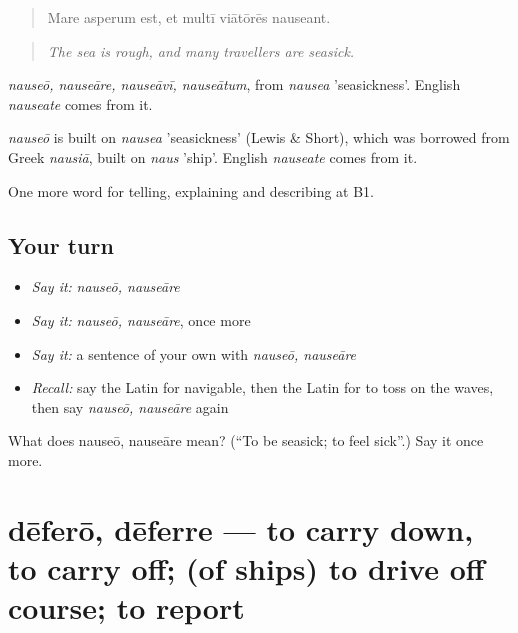 \begin{quote}
Mare asperum est, et multī viātōrēs nauseant.
\end{quote}

\begin{quote}
\emph{The sea is rough, and many travellers are seasick.}
\end{quote}

\emph{nauseō, nauseāre, nauseāvī, nauseātum}, from \emph{nausea} 'seasickness'. English \emph{nauseate} comes from it.

\begin{cousinweb}
\emph{nauseō} is built on \emph{nausea} 'seasickness' (Lewis \& Short), which was borrowed from Greek \emph{nausiā}, built on \emph{naus} 'ship'. English \emph{nauseate} comes from it.
\end{cousinweb}

\begin{grammarlens}[title={What you've built}]
One more word for telling, explaining and describing at B1.
\end{grammarlens}

\subsection*{Your turn}
\begin{itemize}
\raggedright
  \item \emph{Say it:} \emph{nauseō, nauseāre}
  \item \emph{Say it:} \emph{nauseō, nauseāre}, once more
  \item \emph{Say it:} a sentence of your own with \emph{nauseō, nauseāre}
  \item \emph{Recall:} say the Latin for navigable, then the Latin for to toss on the waves, then say \emph{nauseō, nauseāre} again
\end{itemize}

\begin{tcolorbox}[breakable,colback=teal!4,colframe=teal!35!black,title={Before you move on}]
What does nauseō, nauseāre mean? (\textquotedblleft{}To be seasick; to feel sick\textquotedblright{}.) Say it once more.
\end{tcolorbox}
\section[dēferō, dēferre]{dēferō, dēferre — to carry down, to carry off; (of ships) to drive off course; to report}

\label{lesson:LA-C440-defero}



